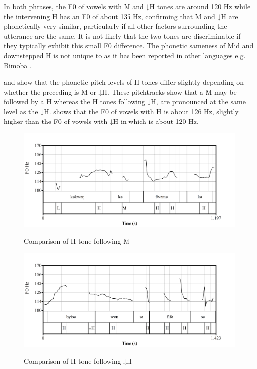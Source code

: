 \documentclass[output=paper,modfonts,nonflat,
 hidelinks
]{langsci/langscibook}
\begin{document}
  
  
In both phrases, the F0 of vowels with M and ↓H tones are around 120 Hz while the intervening H  has an F0 of about 135 Hz, confirming that M and ↓H are phonetically very similar, particularly if all other factors surrounding the utterance are the same. It is not likely that the two tones are discriminable if they typically exhibit this small F0 difference. The phonetic sameness of Mid and downstepped H is not unique to  as it has been reported in other languages e.g. Bimoba \citep{Snider1998}. 
	
 and  show that the phonetic pitch levels of H tones differ slightly depending on whether the preceding  is M or ↓H. These pitchtracks show that a M  may be followed by a H  whereas the H tones following ↓H, are pronounced at the same level as the ↓H.  shows that the F0 of vowels with H  is about 126 Hz, slightly higher than the F0 of vowels with ↓H in  which is about 120 Hz. 

\begin{figure}[p]
	{\includegraphics[width=.95\textwidth]{figures/fig-akumbu-3a}}\\
    \caption{Comparison of H tone following M} \label{fig:akumbu:3}
\end{figure}
\begin{figure}
	{\includegraphics[width=.95\textwidth]{figures/fig-akumbu-3b}}
    \caption{Comparison of H tone following ↓H} \label{fig:akumbu:4}
\end{figure}
\end{document}
